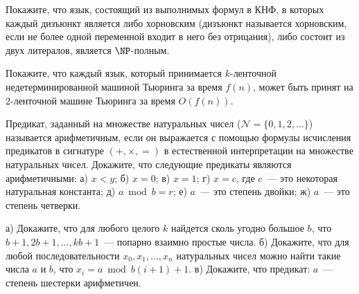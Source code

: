 \begin{task}
	Покажите, что язык, состоящий из выполнимых формул в КНФ, в которых каждый дизъюнкт является либо хорновским (дизъюнкт
    называется хорновским, если не более одной переменной входит в него без отрицания), либо состоит из двух литералов, является
    $\NP$-полным.
\end{task}


\breakline

\begin{ptask}{8}
    Покажите, что каждый язык, который принимается $k$-ленточной недетерминированной машиной Тьюринга за время $f(n)$, может быть
    принят на $2$-ленточной машине Тьюринга за время $O(f(n))$.
\end{ptask}

\begin{ptask}{18}
	Предикат, заданный на множестве натуральных чисел ($\mathcal{N} = \{0, 1, 2, \dots\}$) называется арифметичным, если он
    выражается с помощью формулы исчисления предикатов в сигнатуре $(+, \times, =)$ в естественной интерпретации на множестве
    натуральных чисел. Докажите, что следующие предикаты являются арифметичными: 
	а) $x < y$; б) $x = 0$; в) $x = 1$; г) $x = c$, где $c$~--- это некоторая натуральная константа; д) $a \bmod b = r$; е)
    $a$~--- это степень двойки; ж) $a$~--- это степень четверки. 
\end{ptask}


\begin{ptask}{19}
	а) Докажите, что для любого целого $k$ найдется сколь угодно большое $b$, что $b + 1, 2 b + 1, \dots, k b + 1$~--- попарно
    взаимно простые числа. б) Докажите, что для любой последовательности $x_0, x_1, \dots, x_n$ натуральных чисел можно найти
    такие числа $a$ и $b$, что $x_i = a \bmod b (i + 1) + 1$. в) Докажите, что предикат: $a$~--- степень шестерки арифметичен.    
\end{ptask}